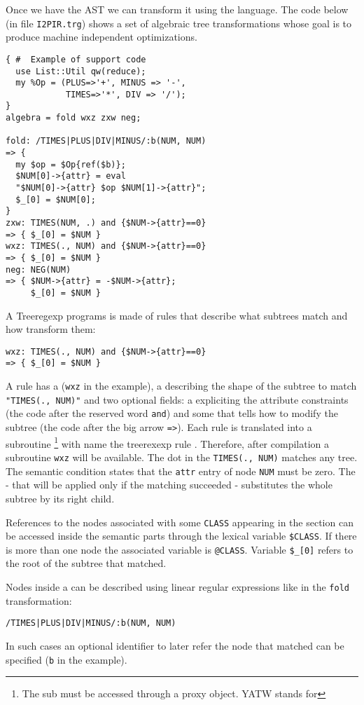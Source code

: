 Once we have the AST we can transform it
using the  language.
The code below (in file \verb|I2PIR.trg|)
shows a set of algebraic tree transformations
whose goal is to produce 
machine independent optimizations.
\begin{verbatim}
{ #  Example of support code
  use List::Util qw(reduce);
  my %Op = (PLUS=>'+', MINUS => '-',
            TIMES=>'*', DIV => '/');
}
algebra = fold wxz zxw neg;

fold: /TIMES|PLUS|DIV|MINUS/:b(NUM, NUM)
=> {
  my $op = $Op{ref($b)};
  $NUM[0]->{attr} = eval
  "$NUM[0]->{attr} $op $NUM[1]->{attr}";
  $_[0] = $NUM[0];
}
zxw: TIMES(NUM, .) and {$NUM->{attr}==0}
=> { $_[0] = $NUM }
wxz: TIMES(., NUM) and {$NUM->{attr}==0}
=> { $_[0] = $NUM }
neg: NEG(NUM)
=> { $NUM->{attr} = -$NUM->{attr};
     $_[0] = $NUM }
\end{verbatim}
A Treeregexp programs is made of  rules
that describe what subtrees match and how transform them:
\begin{verbatim}
wxz: TIMES(., NUM) and {$NUM->{attr}==0}
=> { $_[0] = $NUM }
\end{verbatim}
A rule has a  (\verb|wxz| in the example), 
a  describing
the shape of the subtree to match \verb|"TIMES(., NUM)"|
and two optional fields:
a  expliciting
the attribute constraints (the code after the reserved word
\verb|and|)
and some  that tells how to 
modify the subtree (the code after the big arrow \verb|=>|).
Each rule is translated into a subroutine 
\footnote{The sub must be accessed 
through a proxy 
 object. YATW stands for }
with name the treerexexp rule .
Therefore, after compilation 
a subroutine \verb|wxz| will be available.
The dot in the  \verb|TIMES(., NUM)| 
matches any tree. The semantic condition
states that the \verb|attr| entry of node
\verb|NUM| must be zero.
The  - that will be 
applied only if the matching succeeded -
substitutes the whole subtree by its 
right child.

References to the nodes associated with some
\verb|CLASS| appearing in the 
section can be accessed inside the semantic parts
through the lexical variable \verb|$CLASS|.
If there is more than one node the 
associated variable is \verb|@CLASS|. Variable \verb|$_[0]|
refers to the root of the subtree that matched.

Nodes inside a  can be described using linear
regular expressions like in the \verb|fold| transformation:
\begin{verbatim}
/TIMES|PLUS|DIV|MINUS/:b(NUM, NUM)
\end{verbatim}
In such cases an optional identifier 
to later refer the node that matched 
can be specified (\verb|b| in the example).

